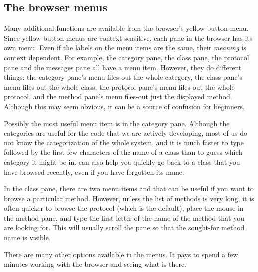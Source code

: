 \documentclass[a4paper,10pt,twoside]{book}
\begin{document}
\subsection{The browser menus}

Many additional functions are available from the browser's yellow button menu.  
Since yellow button menus are context-sensitive,  each pane in the browser has its own menu.  
Even if the labels on the menu items are the same, their \emph{meaning} is context dependent.  
For example, the category pane, the class pane, the protocol pane and the messages pane all have a  menu item.  However, they do different things: the category pane's  menu files out the whole category, the class pane's  menu files-out the whole class, the protocol pane's  menu files out the whole protocol, and the method pane's  menu files-out just the displayed method.
Although this may seem obvious, it can be a source of confusion for beginners. 

Possibly the most useful menu item is  in the category pane.  Although the categories are useful for the code that we are actively developing, most of us do not know the categorization of the whole system, and it is much faster to type  followed by the first few characters of the name of a class than to guess which category it might be in.   can also help you quickly go back to a class that you have browsed recently, even if you have forgotten its name.

In the class pane, there are two menu items  and  that can be useful if you want to browse a particular method.  However, unless the list of methods is very long, it is often quicker to browse the  protocol (which is the default), place the mouse in the method pane, and type the first letter of the name of the method that you are looking for.
This will usually scroll the pane so that the sought-for method name is visible.


There are many other options available in the menus.  It pays to spend a few minutes working with the browser and seeing what is there.   
\end{document}
